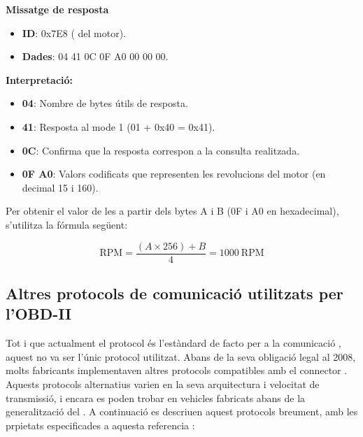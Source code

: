 \documentclass{tfgitic}[2024/07/01]
\begin{document}
\textbf{Missatge de resposta}

\begin{itemize}
  \item \textbf{ID}: 0x7E8 ( del motor).
  
  \item \textbf{Dades}: 04 41 0C 0F A0 00 00 00.
\end{itemize} 

\textbf{Interpretació:}

\begin{itemize}
  \item \textbf{04}: Nombre de bytes útils de resposta.
  
  \item \textbf{41}: Resposta al mode 1 (01 + 0x40 = 0x41).
  
  \item \textbf{0C}: Confirma que la resposta correspon a la consulta realitzada.

  \item \textbf{0F A0}: Valors codificats que representen les revolucions del motor (en decimal 15 i 160).
\end{itemize} 

Per obtenir el valor de les  a partir dels bytes A i B (0F i A0 en hexadecimal), s'utilitza la fórmula següent:

\[
\text{RPM} = \frac{(A \times 256) + B}{4} = 1000\ \text{RPM}
\]

\subsection{Altres protocols de comunicació utilitzats per l'OBD-II}

Tot i que actualment el protocol  és l'estàndard de facto per a la comunicació , aquest no va ser l'únic protocol utilitzat. 
Abans de la seva obligació legal al 2008, molts fabricants  implementaven altres protocols compatibles amb el connector . Aquests protocols 
alternatius varien en la seva arquitectura i velocitat de transmissió, i encara es poden trobar en vehicles fabricats abans de la generalització del . 
A continuació es descriuen aquest protocols breument, amb les prpietats especificades a aquesta referencia \cite{sparkfun_obd2}:
\end{document}
